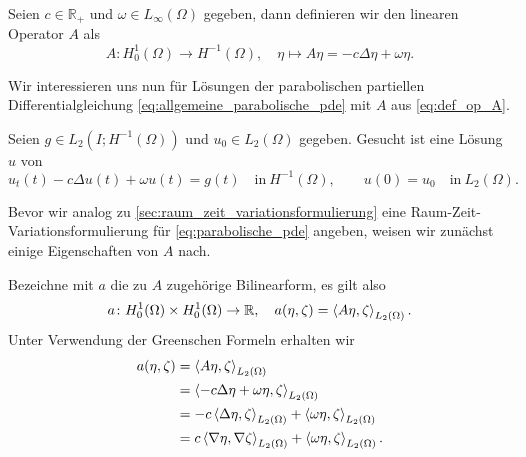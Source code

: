 Seien $c \in \mathbb{R}_{+}$ und $\omega \in L_{\infty}(\Omega)$ gegeben, dann definieren wir den linearen Operator $A$ als
\begin{equation}
    \label{eq:def_op_A}
    A \colon H^{1}_{0}(\Omega) \to H^{-1}(\Omega), \quad \eta \mapsto A \eta = - c \Delta \eta + \omega \eta.
\end{equation}

Wir interessieren uns nun für Lösungen der parabolischen partiellen Differentialgleichung \eqref{eq:allgemeine_parabolische_pde} mit $A$ aus \eqref{eq:def_op_A}.
\begin{Problem}
Seien $g \in L_{2}(I; H^{-1}(\Omega))$ und $u_{0} \in L_{2}(\Omega)$ gegeben.
Gesucht ist eine Lösung $u$ von
\begin{equation}
    \label{eq:parabolische_pde}
    u_{t}(t) - c \Delta u(t) + \omega u(t) = g(t) \quad \text{in}~H^{-1}(\Omega),
    \qquad
    u(0) = u_{0} \quad \text{in}~L_{2}(\Omega).
\end{equation}
\end{Problem}

Bevor wir analog zu \autoref{sec:raum_zeit_variationsformulierung} eine Raum-Zeit-Variationsformulierung für \eqref{eq:parabolische_pde} angeben, weisen wir zunächst einige Eigenschaften von $A$ nach.

Bezeichne mit $a$ die zu $A$ zugehörige Bilinearform, es gilt also
\begin{equation}
    a \colon H^{1}_{0}(\Omega) \times H^{1}_{0}(\Omega) \to \mathbb{R}, \quad a(\eta, \zeta) = \left\langle A \eta,\zeta\right\rangle_{L_{2}(\Omega)}.
\end{equation}
Unter Verwendung der Greenschen Formeln erhalten wir
\begin{equation}
    \begin{aligned}
        a(\eta, \zeta)
        &= \left\langle A \eta,\zeta\right\rangle_{L_{2}(\Omega)}
        \\&= \left\langle- c \Delta \eta + \omega \eta,\zeta\right\rangle_{L_{2}(\Omega)}
        \\&= - c \left\langle\Delta \eta,\zeta\right\rangle_{L_{2}(\Omega)} + \left\langle\omega \eta,\zeta\right\rangle_{L_{2}(\Omega)}
        \\&= c \left\langle\nabla \eta,\nabla \zeta\right\rangle_{L_{2}(\Omega)} + \left\langle\omega \eta,\zeta\right\rangle_{L_{2}(\Omega)}.
    \end{aligned}
\end{equation}


